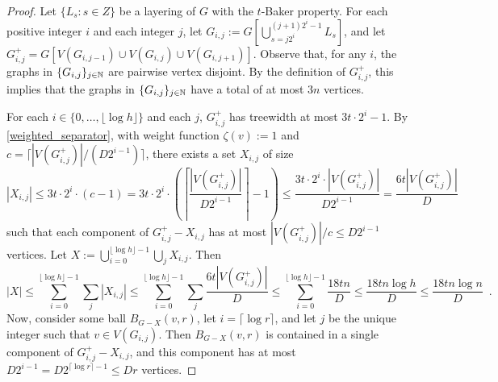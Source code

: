 \documentclass{patmorin}
\renewcommand{\le}{\leqslant}
\begin{document}
\begin{proof}
  Let $\{L_s:s\in Z\}$ be a layering of $G$ with the $t$-Baker property. For each positive integer $i$ and each integer $j$, let $G_{i,j}:=G[\bigcup_{s=j2^i}^{(j+1)2^i-1} L_s]$,  and let $G^+_{i,j}=G[V(G_{i,j-1})\cup V(G_{i,j})\cup V(G_{i,j+1})]$.  Observe that, for any $i$, the graphs in $\{ G_{i,j}\}_{j\in\mathbb{N}}$ are pairwise vertex disjoint.  By the definition of $G^+_{i,j}$, this implies that the graphs in $\{ G_{i,j}\}_{j\in\mathbb{N}}$ have a total of at most $3n$ vertices.

  For each $i\in\{0,\ldots,\lfloor \log h\rfloor\}$ and each $j$, $G^+_{i,j}$ has treewidth at most $3t\cdot 2^i-1$.  By \cref{weighted_separator}, with weight function $\zeta(v):=1$ and $c=\lceil |V(G^+_{i,j})|/(D2^{i-1})\rceil$, there exists a set $X_{i,j}$ of size
  \[
    |X_{i,j}|\le 3t\cdot 2^i\cdot(c-1) =
    3t\cdot 2^i\cdot\left(\left\lceil\frac{ |V(G^+_{i,j})|}{D2^{i-1}}\right\rceil-1\right) \le
    \frac{3t\cdot 2^i\cdot|V(G^+_{i,j})|}{ D2^{i-1}}
    = \frac{6t|V(G^+_{i,j})|}{D}
  \]
  such that each component of $G^+_{i,j}-X_{i,j}$ has at most $|V(G^+_{i,j})|/c \le D2^{i-1}$ vertices.  Let $X:=\bigcup_{i=0}^{\lfloor\log h\rfloor-1}\bigcup_{j}X_{i,j}$.  Then
  \[
    |X| \le
    \sum_{i=0}^{\lfloor\log h\rfloor-1}\sum_{j} |X_{i,j}|
    \le
    \sum_{i=0}^{\lfloor\log h\rfloor-1}\sum_{j} \frac{6t|V(G^+_{i,j})|}{D}
    \le
    \sum_{i=0}^{\lfloor\log h\rfloor-1}\frac{18tn}{D}
    \le \frac{18tn\log h}{D}\le\frac{18tn\log n}{D}
    \enspace .
  \]
  Now, consider some ball $B_{G-X}(v,r)$, let $i=\lceil\log r\rceil$, and let $j$ be the unique integer such that $v\in V(G_{i,j})$.  Then $B_{G-X}(v,r)$ is contained in a single component of $G^+_{i,j}-X_{i,j}$, and this component has at most $D2^{i-1}=D2^{\lceil\log r\rceil-1}\le Dr$ vertices.
\end{proof}




\end{document}
